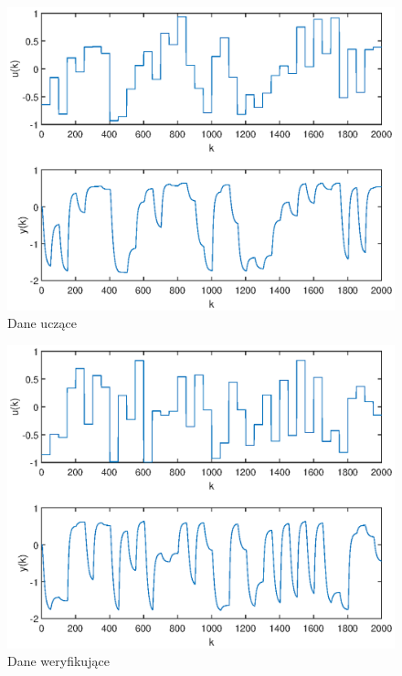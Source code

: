 		\begin{figure}[h!]
			\centering
			\includegraphics[width=0.9\linewidth]{img/dane_ucz.eps}
			\caption{Dane uczące}
			\label{fig:d_ucz}
		\end{figure}
		
		\begin{figure}[h!]
			\centering
			\includegraphics[width=0.9\linewidth]{img/dane_wer.eps}
			\caption{Dane weryfikujące}
			\label{fig:d_wer}
		\end{figure}